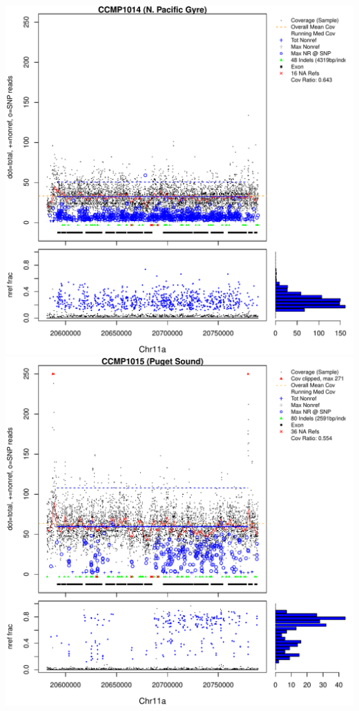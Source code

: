 \documentclass{article}\usepackage[]{graphicx}\usepackage[]{color}
\makeatletter
\def\maxwidth{ %
  \ifdim\Gin@nat@width>\linewidth
    \linewidth
  \else
    \Gin@nat@width
  \fi
}
\newenvironment{knitrout}{}{} %
\makeatother
\begin{document}
\begin{knitrout}
{\includegraphics[width=\maxwidth]{figs-knitr/unnamed-chunk-50-5} 
\includegraphics[width=\maxwidth]{figs-knitr/unnamed-chunk-50-6} 
}
\end{knitrout}
\end{document}
